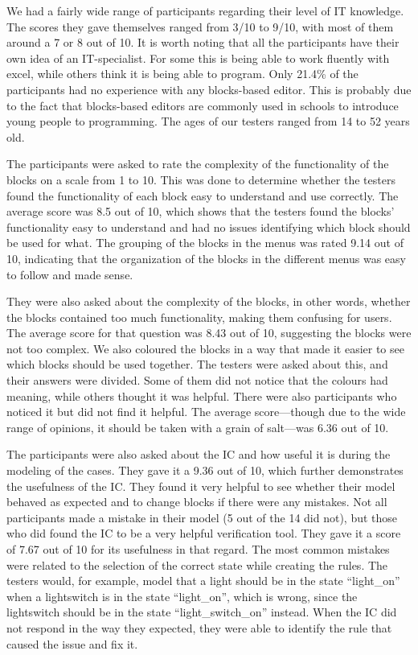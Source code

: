 \documentclass[11pt,a4paper]{report}
\begin{document}
We had a fairly wide range of participants regarding their level of IT knowledge. The scores they gave themselves ranged from 3/10 to 9/10, with most of them around a 7 or 8 out of 10. It is worth noting that all the participants have their own idea of an IT-specialist. For some this is being able to work fluently with excel, while others think it is being able to program. Only 21.4\% of the participants had no experience with any blocks-based editor. This is probably due to the fact that blocks-based editors are commonly used in schools to introduce young people to programming. The ages of our testers ranged from 14 to 52 years old.

The participants were asked to rate the complexity of the functionality of the blocks on a scale from 1 to 10. This was done to determine whether the testers found the functionality of each block easy to understand and use correctly. The average score was 8.5 out of 10, which shows that the testers found the blocks' functionality easy to understand and had no issues identifying which block should be used for what. The grouping of the blocks in the menus was rated 9.14 out of 10, indicating that the organization of the blocks in the different menus was easy to follow and made sense.

They were also asked about the complexity of the blocks, in other words, whether the blocks contained too much functionality, making them confusing for users. The average score for that question was 8.43 out of 10, suggesting the blocks were not too complex. We also coloured the blocks in a way that made it easier to see which blocks should be used together. The testers were asked about this, and their answers were divided. Some of them did not notice that the colours had meaning, while others thought it was helpful. There were also participants who noticed it but did not find it helpful. The average score—though due to the wide range of opinions, it should be taken with a grain of salt—was 6.36 out of 10.

The participants were also asked about the IC and how useful it is during the modeling of the cases. They gave it a 9.36 out of 10, which further demonstrates the usefulness of the IC. They found it very helpful to see whether their model behaved as expected and to change blocks if there were any mistakes. Not all participants made a mistake in their model (5 out of the 14 did not), but those who did found the IC to be a very helpful verification tool. They gave it a score of 7.67 out of 10 for its usefulness in that regard. The most common mistakes were related to the selection of the correct state while creating the rules. The testers would, for example, model that a light should be in the state ``light\_on'' when a lightswitch is in the state ``light\_on'', which is wrong, since the lightswitch should be in the state ``light\_switch\_on'' instead. When the IC did not respond in the way they expected, they were able to identify the rule that caused the issue and fix it.
\end{document}
